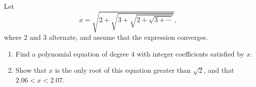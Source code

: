 Let
\[
x=\sqrt{2+\sqrt{3+\sqrt{2+\sqrt{3+\cdots}}}},
\]
where $2$ and $3$ alternate, and assume that the expression converges.
\begin{enumerate}
\item[(a)] Find a polynomial equation of degree $4$ with integer coefficients satisfied by $x$.
\item[(b)] Show that $x$ is the only root of this equation greater than $\sqrt2$, and that $2.06<x<2.07$.
\end{enumerate}
